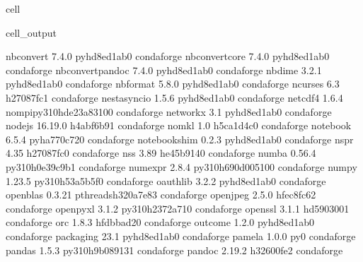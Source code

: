\documentclass[letterpaper,table,10pt,english]{jupyterBook}
\begin{document}
\begin{sphinxuseclass}{cell}
\begin{sphinxVerbatimOutput}
\begin{sphinxuseclass}{cell_output}
\begin{sphinxVerbatim}[commandchars=\\\{\}]
nbconvert                 7.4.0              pyhd8ed1ab\PYGZus{}0    conda\PYGZhy{}forge
nbconvert\PYGZhy{}core            7.4.0              pyhd8ed1ab\PYGZus{}0    conda\PYGZhy{}forge
nbconvert\PYGZhy{}pandoc          7.4.0              pyhd8ed1ab\PYGZus{}0    conda\PYGZhy{}forge
nbdime                    3.2.1              pyhd8ed1ab\PYGZus{}0    conda\PYGZhy{}forge
nbformat                  5.8.0              pyhd8ed1ab\PYGZus{}0    conda\PYGZhy{}forge
ncurses                   6.3                  h27087fc\PYGZus{}1    conda\PYGZhy{}forge
nest\PYGZhy{}asyncio              1.5.6              pyhd8ed1ab\PYGZus{}0    conda\PYGZhy{}forge
netcdf4                   1.6.4           nompi\PYGZus{}py310hde23a83\PYGZus{}100    conda\PYGZhy{}forge
networkx                  3.1                pyhd8ed1ab\PYGZus{}0    conda\PYGZhy{}forge
nodejs                    16.19.0              h4abf6b9\PYGZus{}1    conda\PYGZhy{}forge
nomkl                     1.0                  h5ca1d4c\PYGZus{}0    conda\PYGZhy{}forge
notebook                  6.5.4              pyha770c72\PYGZus{}0    conda\PYGZhy{}forge
notebook\PYGZhy{}shim             0.2.3              pyhd8ed1ab\PYGZus{}0    conda\PYGZhy{}forge
nspr                      4.35                 h27087fc\PYGZus{}0    conda\PYGZhy{}forge
nss                       3.89                 he45b914\PYGZus{}0    conda\PYGZhy{}forge
numba                     0.56.4          py310h0e39c9b\PYGZus{}1    conda\PYGZhy{}forge
numexpr                   2.8.4           py310h690d005\PYGZus{}100    conda\PYGZhy{}forge
numpy                     1.23.5          py310h53a5b5f\PYGZus{}0    conda\PYGZhy{}forge
oauthlib                  3.2.2              pyhd8ed1ab\PYGZus{}0    conda\PYGZhy{}forge
openblas                  0.3.21          pthreads\PYGZus{}h320a7e8\PYGZus{}3    conda\PYGZhy{}forge
openjpeg                  2.5.0                hfec8fc6\PYGZus{}2    conda\PYGZhy{}forge
openpyxl                  3.1.2           py310h2372a71\PYGZus{}0    conda\PYGZhy{}forge
openssl                   3.1.1                hd590300\PYGZus{}1    conda\PYGZhy{}forge
orc                       1.8.3                hfdbbad2\PYGZus{}0    conda\PYGZhy{}forge
outcome                   1.2.0              pyhd8ed1ab\PYGZus{}0    conda\PYGZhy{}forge
packaging                 23.1               pyhd8ed1ab\PYGZus{}0    conda\PYGZhy{}forge
pamela                    1.0.0                      py\PYGZus{}0    conda\PYGZhy{}forge
pandas                    1.5.3           py310h9b08913\PYGZus{}1    conda\PYGZhy{}forge
pandoc                    2.19.2               h32600fe\PYGZus{}2    conda\PYGZhy{}forge

\end{sphinxVerbatim}
\end{sphinxuseclass}
\end{sphinxVerbatimOutput}
\end{sphinxuseclass}
\end{document}
